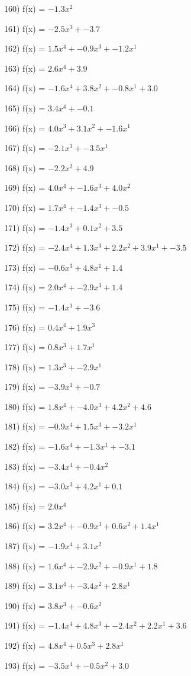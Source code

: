 \documentclass[10pt,a4paper]{article}
\begin{document}
160) f(x) = $-1.3x^2$

161) f(x) = $-2.5x^3 + -3.7$

162) f(x) = $1.5x^4 + -0.9x^3 + -1.2x^1$

163) f(x) = $2.6x^4 + 3.9$

164) f(x) = $-1.6x^4 + 3.8x^2 + -0.8x^1 + 3.0$

165) f(x) = $3.4x^4 + -0.1$

166) f(x) = $4.0x^3 + 3.1x^2 + -1.6x^1$

167) f(x) = $-2.1x^3 + -3.5x^1$

168) f(x) = $-2.2x^2 + 4.9$

169) f(x) = $4.0x^4 + -1.6x^3 + 4.0x^2$

170) f(x) = $1.7x^4 + -1.4x^3 + -0.5$

171) f(x) = $-1.4x^3 + 0.1x^2 + 3.5$

172) f(x) = $-2.4x^4 + 1.3x^3 + 2.2x^2 + 3.9x^1 + -3.5$

173) f(x) = $-0.6x^3 + 4.8x^1 + 1.4$

174) f(x) = $2.0x^4 + -2.9x^3 + 1.4$

175) f(x) = $-1.4x^1 + -3.6$

176) f(x) = $0.4x^4 + 1.9x^3$

177) f(x) = $0.8x^3 + 1.7x^1$

178) f(x) = $1.3x^3 + -2.9x^1$

179) f(x) = $-3.9x^1 + -0.7$

180) f(x) = $1.8x^4 + -4.0x^3 + 4.2x^2 + 4.6$

181) f(x) = $-0.9x^4 + 1.5x^3 + -3.2x^1$

182) f(x) = $-1.6x^4 + -1.3x^1 + -3.1$

183) f(x) = $-3.4x^4 + -0.4x^2$

184) f(x) = $-3.0x^3 + 4.2x^1 + 0.1$

185) f(x) = $2.0x^4$

186) f(x) = $3.2x^4 + -0.9x^3 + 0.6x^2 + 1.4x^1$

187) f(x) = $-1.9x^4 + 3.1x^2$

188) f(x) = $1.6x^4 + -2.9x^2 + -0.9x^1 + 1.8$

189) f(x) = $3.1x^4 + -3.4x^2 + 2.8x^1$

190) f(x) = $3.8x^3 + -0.6x^2$

191) f(x) = $-1.4x^4 + 4.8x^3 + -2.4x^2 + 2.2x^1 + 3.6$

192) f(x) = $4.8x^4 + 0.5x^3 + 2.8x^1$

193) f(x) = $-3.5x^4 + -0.5x^2 + 3.0$
\end{document}
